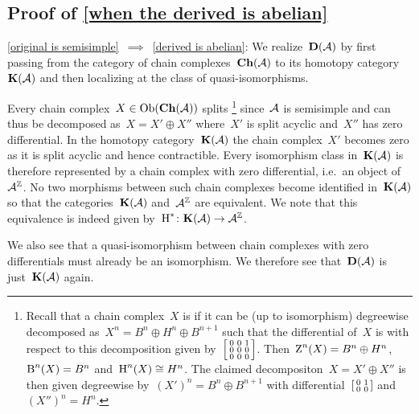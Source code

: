\documentclass[a4paper,10pt]{scrartcl}
\begin{document}
\subsection{Proof of \cref{when the derived is abelian}}
\label{when the derived is abelian proof}

\begin{implicationslist}
\item[\ref{original is semisimple}~$\implies$~\ref{derived is abelian}:]
  We realize~$\mathbf{D}(\mathcal{A})$ by first passing from the category of chain complexes~$\mathbf{Ch}(\mathcal{A})$ to its homotopy category~$\mathbf{K}(\mathcal{A})$ and then localizing at the class of quasi-isomorphisms.
  
  Every chain complex~$X \in \operatorname{Ob}(\mathbf{Ch}(\mathcal{A}))$ splits%
  \footnote{Recall that a chain complex~$X$ is  if it can be (up to isomorphism) degreewise decomposed as~$X^n = B^n \oplus H^n \oplus B^{n+1}$ such that the differential of~$X$ is with respect to this decomposition given by~$\begin{bsmallmatrix} 0 & 0 & 1 \\ 0 & 0 & 0 \\ 0 & 0 & 0 \end{bsmallmatrix}$.
  Then~$\operatorname{Z}^n(X) = B^n \oplus H^n$,~$\operatorname{B}^n(X) = B^n$ and~$\operatorname{H}^n(X) \cong H^n$.
  The claimed decompositon~$X = X' \oplus X''$ is then given degreewise by~$(X')^n = B^n \oplus B^{n+1}$ with differential~$\begin{bsmallmatrix} 0 & 1 \\ 0 & 0 \end{bsmallmatrix}$ and~$(X'')^n = H^n$.}
  since~$\mathcal{A}$ is semisimple and can thus be decomposed as~$X = X' \oplus X''$ where~$X'$ is split acyclic and~$X''$ has zero differential.
  In the homotopy category~$\mathbf{K}(\mathcal{A})$ the chain complex~$X'$ becomes zero as it is split acyclic and hence contractible.
  Every isomorphism class in~$\mathbf{K}(\mathcal{A})$ is therefore represented by a chain complex with zero differential, i.e.\ an object of~$\mathcal{A}^{\mathbb{Z}}$.
  No two morphisms between such chain complexes become identified in~$\mathbf{K}(\mathcal{A})$ so that the categories~$\mathbf{K}(\mathcal{A})$ and~$\mathcal{A}^{\mathbb{Z}}$ are equivalent.
  We note that this equivalence is indeed given by~$\operatorname{H}^* \colon \mathbf{K}(\mathcal{A}) \to \mathcal{A}^{\mathbb{Z}}$.
  
  We also see that a quasi-isomorphism between chain complexes with zero differentials must already be an isomorphism.
  We therefore see that~$\mathbf{D}(\mathcal{A})$ is just~$\mathbf{K}(\mathcal{A})$ again.
  

\end{implicationslist}
\end{document}
